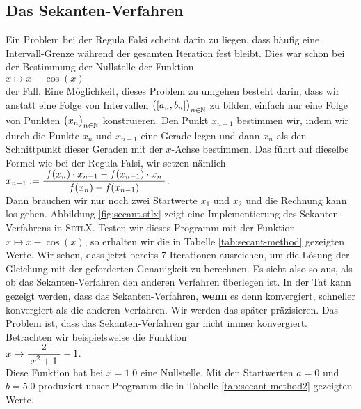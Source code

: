 \subsection{Das Sekanten-Verfahren}
Ein Problem bei der Regula Falsi scheint darin zu liegen, dass h\"aufig eine
Intervall-Grenze w\"ahrend der gesamten Iteration fest bleibt.  Dies war schon bei der
Bestimmung der Nullstelle der Funktion
\\[0.2cm]
\hspace*{1.3cm}
$x \mapsto x - \cos(x)$ 
\\[0.2cm]
der Fall.  Eine
M\"oglichkeit, dieses Problem zu umgehen besteht darin, dass wir anstatt eine Folge von
Intervallen $\bigl([a_n, b_n]\bigr)_{n\in\mathbb{N}}$ zu bilden, einfach nur eine Folge von Punkten
$\bigl(x_n\bigr)_{n\in\mathbb{N}}$ konstruieren.  Den Punkt $x_{n+1}$ bestimmen wir, indem wir durch die Punkte
$x_{n}$ und $x_{n-1}$ eine Gerade legen und dann $x_n$ als den Schnittpunkt dieser Geraden
mit der $x$-Achse bestimmen.  Das f\"uhrt auf dieselbe Formel wie bei der Regula-Falsi, wir
setzen n\"amlich
\\[0.2cm]
\hspace*{1.3cm}
$x_{n+1} := \displaystyle\frac{\;\displaystyle f(x_{n}) \cdot x_{n-1} - f(x_{n-1}) \cdot x_n\;}{\;\displaystyle f(x_{n}) - f(x_{n-1})\;}$.
\\[0.2cm]
Dann brauchen wir nur noch zwei Startwerte $x_1$ und $x_2$ und die Rechnung kann los gehen.
Abbildung \ref{fig:secant.stlx} zeigt eine Implementierung des Sekanten-Verfahrens in
\textsc{SetlX}.  Testen wir dieses Programm mit der Funktion $x \mapsto x - \cos(x)$, so
erhalten wir die in Tabelle \ref{tab:secant-method} gezeigten Werte.
Wir sehen, dass jetzt bereits 7 Iterationen ausreichen, um die L\"osung der Gleichung mit
der geforderten Genauigkeit zu berechnen.  Es sieht also so aus, als ob das
Sekanten-Verfahren den anderen Verfahren \"uberlegen ist.  In der Tat kann gezeigt werden, dass
das Sekanten-Verfahren, \textbf{wenn} es denn konvergiert, schneller konvergiert als die anderen
Verfahren. Wir werden das sp\"ater pr\"azisieren.  Das Problem ist, dass das Sekanten-Verfahren
gar nicht immer konvergiert.  Betrachten wir beispielsweise die Funktion 
\\[0.2cm]
\hspace*{1.3cm}
$x \mapsto \displaystyle\frac{\;\displaystyle2\;}{\;\displaystyle x^2 + 1\;} - 1$. 
\\[0.2cm]
Diese Funktion hat bei $x = 1.0$ eine Nullstelle.  Mit
den Startwerten $a = 0$ und $b = 5.0$ produziert unser Programm die in Tabelle
\ref{tab:secant-method2}
gezeigten Werte.


